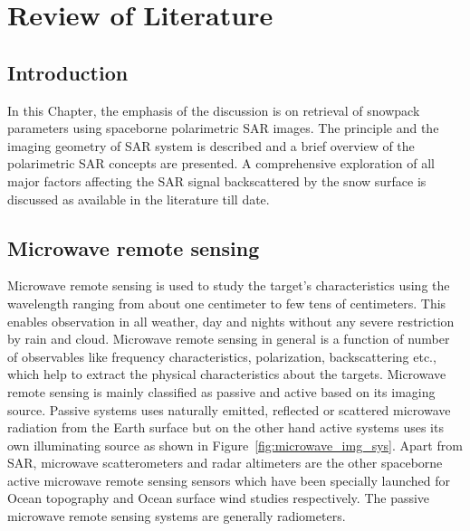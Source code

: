 \chapter{Review of Literature}
\label{sec:2}
\section{Introduction}
In this Chapter, the emphasis of the discussion is on retrieval of snowpack parameters using spaceborne polarimetric SAR images. The principle and the imaging geometry of SAR system is described and a brief overview of the polarimetric SAR concepts are presented. A comprehensive exploration of all major factors affecting the SAR signal backscattered by the snow surface is discussed as available in the literature till date. 

\section{Microwave remote sensing}
Microwave remote sensing is used to study the target's characteristics using the wavelength ranging from about one centimeter to few tens of centimeters. This enables observation in all weather, day and nights without any severe restriction by rain and cloud. Microwave remote sensing in general is a function of number of observables like frequency characteristics, polarization, backscattering etc., which help to extract the physical characteristics about the targets. Microwave remote sensing is mainly classified as passive and active based on its imaging source. Passive systems uses naturally emitted, reflected or scattered microwave radiation from the Earth surface but on the other hand active systems uses its own illuminating source as shown in Figure~\ref{fig:microwave_img_sys}. Apart from SAR, microwave scatterometers and radar altimeters are the other spaceborne active microwave remote sensing sensors which have been specially launched for Ocean topography and Ocean surface wind studies respectively. The passive microwave remote sensing systems are generally radiometers.  
